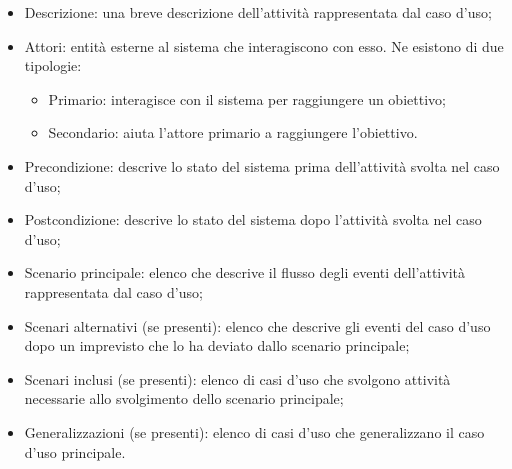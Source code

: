 	\begin{itemize}
		\item Descrizione: una breve descrizione dell'attività rappresentata dal caso d'uso;
		\item Attori: entità esterne al sistema che interagiscono con esso. Ne esistono di due tipologie:
		\begin{itemize}
			\item Primario: interagisce con il sistema per raggiungere un obiettivo;
			\item Secondario: aiuta l'attore primario a raggiungere l'obiettivo.
		\end{itemize}
		\item Precondizione: descrive lo stato del sistema prima dell'attività svolta nel caso d'uso;
		\item Postcondizione: descrive lo stato del sistema dopo l'attività svolta nel caso d'uso;
		\item Scenario principale: elenco che descrive il flusso degli eventi dell'attività rappresentata dal caso d'uso;
		\item Scenari alternativi (se presenti): elenco che descrive gli eventi del caso d'uso dopo un imprevisto che lo ha deviato dallo scenario principale;
		\item Scenari inclusi (se presenti): elenco di casi d'uso che svolgono attività necessarie allo svolgimento dello scenario principale;
		\item Generalizzazioni (se presenti): elenco di casi d'uso che generalizzano il caso d'uso principale.
	\end{itemize}
    
